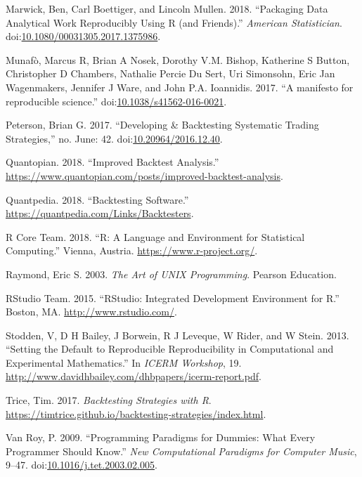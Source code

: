 \documentclass[11pt,preprint, authoryear]{elsarticle}
\numberwithin{equation}{section}
\numberwithin{figure}{section}
\numberwithin{table}{section}
\begin{document}
\hypertarget{ref-Marwick2018}{}
Marwick, Ben, Carl Boettiger, and Lincoln Mullen. 2018. ``Packaging Data
Analytical Work Reproducibly Using R (and Friends).'' \emph{American
Statistician}.
doi:\href{https://doi.org/10.1080/00031305.2017.1375986}{10.1080/00031305.2017.1375986}.

\hypertarget{ref-Munafo2017}{}
Munafò, Marcus R, Brian A Nosek, Dorothy V.M. Bishop, Katherine S
Button, Christopher D Chambers, Nathalie Percie Du Sert, Uri Simonsohn,
Eric Jan Wagenmakers, Jennifer J Ware, and John P.A. Ioannidis. 2017.
``A manifesto for reproducible science.''
doi:\href{https://doi.org/10.1038/s41562-016-0021}{10.1038/s41562-016-0021}.

\hypertarget{ref-Peterson2017}{}
Peterson, Brian G. 2017. ``Developing \& Backtesting Systematic Trading
Strategies,'' no. June: 42.
doi:\href{https://doi.org/10.20964/2016.12.40}{10.20964/2016.12.40}.

\hypertarget{ref-Quantopian2018}{}
Quantopian. 2018. ``Improved Backtest Analysis.''
\url{https://www.quantopian.com/posts/improved-backtest-analysis}.

\hypertarget{ref-Quantpedia2018}{}
Quantpedia. 2018. ``Backtesting Software.''
\url{https://quantpedia.com/Links/Backtesters}.

\hypertarget{ref-RCoreTeam2018}{}
R Core Team. 2018. ``R: A Language and Environment for Statistical
Computing.'' Vienna, Austria. \url{https://www.r-project.org/}.

\hypertarget{ref-Raymond:2003:AUP:829549}{}
Raymond, Eric S. 2003. \emph{The Art of UNIX Programming}. Pearson
Education.

\hypertarget{ref-RStudioTeam2015}{}
RStudio Team. 2015. ``RStudio: Integrated Development Environment for
R.'' Boston, MA. \url{http://www.rstudio.com/}.

\hypertarget{ref-Stodden2013}{}
Stodden, V, D H Bailey, J Borwein, R J Leveque, W Rider, and W Stein.
2013. ``Setting the Default to Reproducible Reproducibility in
Computational and Experimental Mathematics.'' In \emph{ICERM Workshop},
19. \url{http://www.davidhbailey.com/dhbpapers/icerm-report.pdf}.

\hypertarget{ref-Trice2017}{}
Trice, Tim. 2017. \emph{Backtesting Strategies with R}.
\url{https://timtrice.github.io/backtesting-strategies/index.html}.

\hypertarget{ref-VanRoy2009}{}
Van Roy, P. 2009. ``Programming Paradigms for Dummies: What Every
Programmer Should Know.'' \emph{New Computational Paradigms for Computer
Music}, 9--47.
doi:\href{https://doi.org/10.1016/j.tet.2003.02.005}{10.1016/j.tet.2003.02.005}.
\end{document}
